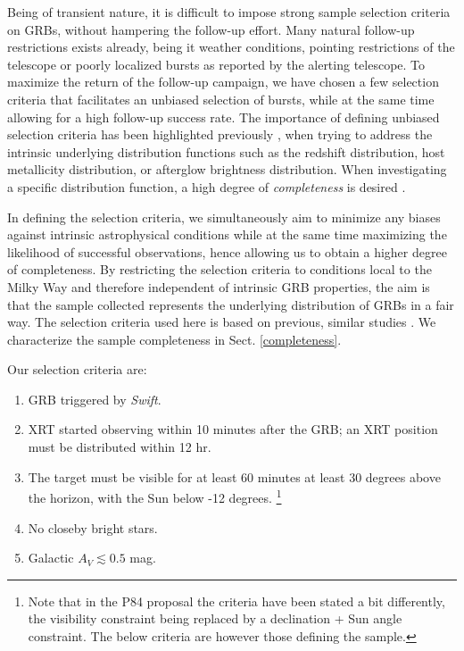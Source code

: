 \documentclass{aa}    %
\begin{document}
Being of transient nature, it is difficult to impose strong sample selection
criteria on GRBs, without hampering the follow-up effort. Many natural follow-up
restrictions exists already, being it weather conditions, pointing restrictions
of the telescope or poorly localized bursts as reported by the alerting
telescope. To maximize the return of the follow-up campaign, we have chosen a
few selection criteria that facilitates an unbiased selection of bursts, while
at the same time allowing for a high follow-up success rate. The importance of
defining unbiased selection criteria has been highlighted previously
\citep{Jakobsson2006b, Salvaterra2012, Hjorth2012, Vergani2015, Perley2016a},
when trying to address the intrinsic underlying distribution functions such as
the redshift distribution, host metallicity distribution, or afterglow
brightness distribution. When investigating a specific distribution function, a
high degree of \textit{completeness} is desired \citep[e.g.,][]{Perley2016b}.

In defining the selection criteria, we simultaneously aim to minimize any biases
against intrinsic astrophysical conditions while at the same time maximizing the
likelihood of successful observations, hence allowing us to obtain a higher
degree of completeness. By restricting the selection criteria to conditions
local to the Milky Way and therefore independent of intrinsic GRB properties,
the aim is that the sample collected represents the underlying distribution of
GRBs in a fair way. The selection criteria used here is based on previous,
similar studies \citep{Jakobsson2006b, Fynbo2009, Hjorth2012}. We characterize
the sample completeness in Sect. \ref{completeness}.

Our selection criteria are:

\begin{enumerate}
	\item GRB triggered by \textit{Swift}.
	\item XRT started observing within 10 minutes after the GRB; an XRT position must be distributed within 12 hr.
	\item The target must be visible for at least 60 minutes at least 30 degrees above the horizon, with the Sun below -12 degrees.
	\footnote{Note that in the P84 proposal the criteria have
	been stated a bit differently, the visibility constraint being replaced by a
	declination + Sun angle constraint. The below criteria are however those
	defining the sample.}
	\item No closeby bright stars.
	\item Galactic $A_V \lesssim 0.5$ mag.
\end{enumerate}
\end{document}
